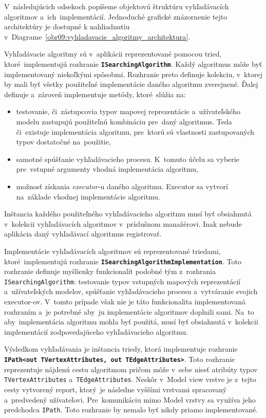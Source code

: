 V~následujúcich odsekoch popíšeme objektovú štruktúru vyhľadávacích algoritmov a~ich~implementácií. Jednoduché grafické znázornenie tejto architektúry je dostupné k nahliadnutiu v~Diagrame~\ref{obr09:vyhladavacie_algoritmy_architektura}.   

\bigskip

Vyhľadávacie algoritmy sú v~aplikácii reprezentované pomocou tried, ktoré~implementujú rozhranie \textbf{\texttt{ISearchingAlgorithm}}. Každý algoritmus môže byť implementovaný niekoľkými spôsobmi. Rozhranie preto definuje kolekciu, v~ktorej by mali byť všetky použiteľné implementácie daného algoritmu zverejnené. Ďalej definuje a~zároveň implementuje metódy, ktoré~slúžia na:
\begin{itemize}
    \item testovanie, či~zástupcovia typov mapovej reprezentácie a~užívateľského modelu zastupujú použiteľnú kombináciu pre~daný algoritmus. Teda či~existuje implementácia algoritmu, pre~ktorú sú vlastnosti zastupovaných typov dostatočné na~použitie, 
    \item samotné spúšťanie vyhľadávacieho procesu. K~tomuto účelu sa vyberie pre~vstupné argumenty vhodná implementácia algoritmu,
    \item možnosť získania \textit{executor}-u daného algoritmu. Executor sa vytvorí na~základe vhodnej implementácie algoritmu.
\end{itemize}
Inštancia každého použiteľného vyhľadávacieho algoritmu musí byť obsiahnutá v~kolekcii vyhľadávacích algoritmov v~príslušnom manažérovi. Inak nebude aplikácia daný vyhľadávací algoritmus registrovať. 

Implementácie vyhľadávacích algoritmov sú reprezentované triedami, ktoré~implementujú rozhranie \textbf{\texttt{ISearchingAlgorithmImplementation}}. Toto rozhranie definuje myšlienky funkcionalít podobné tým z~rozhrania \texttt{ISearchingAlgorithm}: testovanie typov vstupných mapových reprezentácií a~užívateľských modelov, spúšťanie vyhľadávacieho procesu a~vytváranie svojich executor-ov. V~tomto prípade však nie je táto funkcionalita implementovaná rozhraním a~je potrebné aby~ju implementácie algoritmov doplnili sami. Na~to aby~implementácia algoritmu mohla byť použitá, musí byť obsiahnutá v~kolekcii implementácií zodpovedajúceho vyhľadávacieho algoritmu. 

Výsledkom vyhľadávania je inštancia triedy, ktorá implementuje rozhranie \textbf{\texttt{IPath<out TVertexAttributes, out TEdgeAttributes>}}. Toto rozhranie reprezentuje nájdenú cestu algoritmom pričom môže v~sebe niesť atribúty typov \texttt{TVertexAttributes} a~\texttt{TEdgeAttributes}. Neskôr v~Model view vrstve je z~tejto cesty vytvorený report, ktorý~je následne vyššími vrstvami spracovaný a~predvedený užívateľovi. Pre~komunikáciu mimo Model vrstvy sa využíva jeho predchodca \texttt{IPath}. Toto rozhranie by nemalo byť nikdy priamo implementované. 

